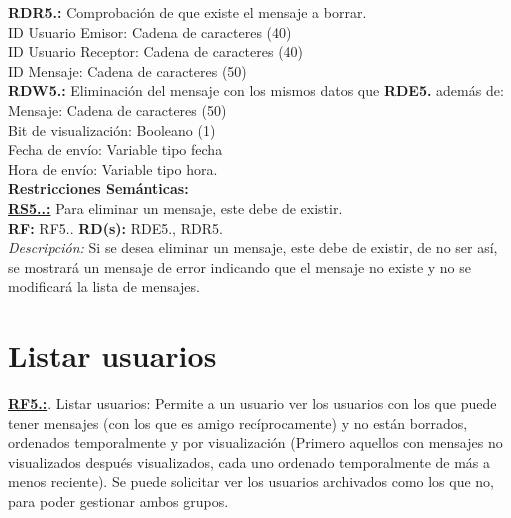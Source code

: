 \textcolor{azul}{\textbf{RDR5.\theRDR:}} Comprobación de que existe el mensaje a borrar. \\
\hspace*{1cm} ID Usuario Emisor: Cadena de caracteres (40) \\
\hspace*{1cm} ID Usuario Receptor: Cadena de caracteres (40) \\
\hspace*{1cm} ID Mensaje: Cadena de caracteres (50) \\[12pt]

\textcolor{azul}{\textbf{RDW5.\theRDW:}} Eliminación del mensaje con los mismos datos que \textcolor{azul}{\textbf{RDE5.\theRDE}} además de:
\hspace*{1cm} Mensaje: Cadena de caracteres (50) \\
\hspace*{1cm} Bit de visualización: Booleano (1) \\
\hspace*{1cm} Fecha de envío: Variable tipo fecha \\
\hspace*{1cm} Hora de envío: Variable tipo hora. \\[12pt]

\setcounter{RS}{1}
\textbf{\textcolor{verde}{Restricciones Semánticas:}} \\[6pt]
\textbf{\textcolor{verde}{\underline{RS5.\theRF.\theRS:}}} Para eliminar un mensaje, este debe de existir. \\
\textbf{RF:} RF5.\theRF. \textbf{RD(s):} RDE5.\theRDE, RDR5.\theRDR \\
\hspace*{1cm} \textit{Descripción:} Si se desea eliminar un mensaje, este debe de existir, de no ser así, se mostrará un mensaje de error indicando que el mensaje no existe y no se modificará la lista de mensajes. \\ [6pt]

\section{Listar usuarios}
\textbf{\textcolor{rojo}{\underline{RF5.\theRF:}}}. Listar usuarios: Permite a un usuario ver los usuarios con los que puede tener mensajes (con los que es amigo recíprocamente) y no están borrados, ordenados temporalmente 
y por visualización (Primero aquellos con mensajes no visualizados después visualizados, cada uno ordenado temporalmente de más a menos reciente). Se puede solicitar ver los usuarios archivados como los que no, para poder 
gestionar ambos grupos.\\[6pt]

